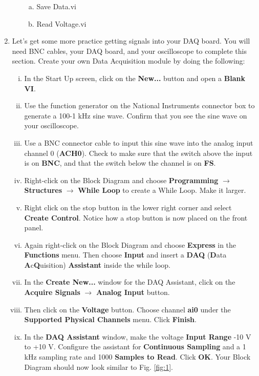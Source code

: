\documentclass[12pt]{article}
\begin{document}
\begin{enumerate}[1.]
\begin{enumerate}[i.]
\begin{enumerate}[a.]
			\item Save Data.vi
			\item Read Voltage.vi
		\end{enumerate}
	\end{enumerate}
	\item Let's get some more practice getting signals into your DAQ board. You will need BNC cables, your DAQ board, and your oscilloscope to complete this section. Create your own Data Acquisition module by doing the following:
	\begin{enumerate}[i.]
		\item In the Start Up screen, click on the \textbf{New...} button and open a \textbf{Blank VI}.
		\item Use the function generator on the National Instruments connector box to generate a 100-1 kHz sine wave. Confirm that you see the sine wave on your oscilloscope.
		\item Use a BNC connector cable to input this sine wave into the analog input channel 0 (\textbf{ACH0}). Check to make sure that the switch above the input is on \textbf{BNC}, and that the switch below the channel is on \textbf{FS}.
		\item Right-click on the Block Diagram and choose \textbf{Programming} $\rightarrow$ \textbf{Structures} $\rightarrow$ \textbf{While Loop} to create a While Loop. Make it larger.
		\item Right click on the stop button in the lower right corner and select {\bf Create Control}. Notice how a stop button is now placed on the front panel.
		\item Again right-click on the Block Diagram and choose \textbf{Express} in the \textbf{Functions} menu. Then choose \textbf{Input} and insert a \textbf{DAQ} (\textbf{D}ata \textbf{A}c\textbf{Q}uisition) \textbf{Assistant} inside the while loop.
		\item In the \textbf{Create New...} window for the DAQ Assistant, click on the {\bf Acquire Signals} $\rightarrow$ \textbf{Analog Input} button.
		\item Then click on the \textbf{Voltage} button. Choose channel \textbf{ai0} under the \textbf{Supported Physical Channels} menu. Click \textbf{Finish}.
		\item In the \textbf{DAQ Assistant} window, make the voltage \textbf{Input Range} -10 V to +10 V. 
		Configure the assistant for \textbf{Continuous Sampling} and a 1 kHz sampling rate and 1000 {\bf Samples to Read}. Click \textbf{OK}. Your Block Diagram should now look similar to Fig. \ref{fig:1}.
	\end{enumerate}
	

\end{enumerate}
\end{document}

